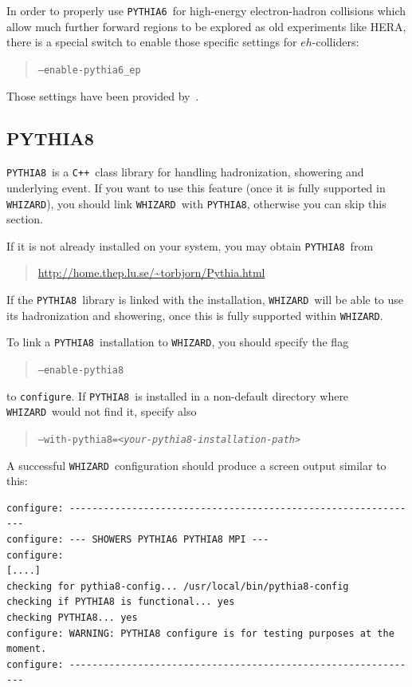 \documentclass[12pt]{book}
\newcommand{\ttt}[1]{\texttt{#1}}
\newcommand{\whizard}{\ttt{WHIZARD}}
\newcommand{\pythiasix}{\ttt{PYTHIA6}}
\newcommand{\pythiaeight}{\ttt{PYTHIA8}}
\newcommand{\cpp}{\ttt{C++}}
\begin{document}
In order to properly use \pythiasix\ for high-energy electron-hadron
collisions which allow much further forward regions to be explored as
old experiments like HERA, there is a special switch to enable those
specific settings for $eh$-colliders:
\begin{quote}
  \ttt{--enable-pythia6\_ep}
\end{quote}
Those settings have been provided by~\cite{UtaKlein}.


\subsection{PYTHIA8}
\label{sec:pythia8}

\pythiaeight\ is a \cpp\ class library for handling hadronization,
showering and underlying event. If you want to use this feature (once it is
fully supported in \whizard), you should link \whizard\ with \pythiaeight,
otherwise you can skip this section.

If it is not already installed on your system, you may obtain
\pythiaeight\ from
\begin{quote}
  \url{http://home.thep.lu.se/~torbjorn/Pythia.html}
\end{quote}
If the \pythiaeight\ library is linked with the installation, \whizard\ will
be able to use its hadronization and showering, once this is fully supported
within \whizard.

To link a \pythiaeight\ installation to \whizard, you should specify the flag
\begin{quote}
\ttt{--enable-pythia8}
\end{quote}
to \ttt{configure}.  If  \pythiaeight\ is installed in a non-default directory
where \whizard\ would not find it, specify also
\begin{quote}
\ttt{--with-pythia8=\emph{<your-pythia8-installation-path>}}
\end{quote}

A successful \whizard\ configuration should produce a screen output
similar to this:
\begin{footnotesize}
\begin{verbatim}
configure: --------------------------------------------------------------
configure: --- SHOWERS PYTHIA6 PYTHIA8 MPI ---
configure:
[....]
checking for pythia8-config... /usr/local/bin/pythia8-config
checking if PYTHIA8 is functional... yes
checking PYTHIA8... yes
configure: WARNING: PYTHIA8 configure is for testing purposes at the moment.
configure: --------------------------------------------------------------
\end{verbatim}
\end{footnotesize}
\end{document}
